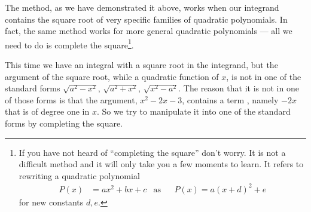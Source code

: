 The method, as we have demonstrated it above, works when our integrand contains the
square root of very specific families of quadratic polynomials. In fact, the same
method works for more general quadratic polynomials --- all we need to do is complete
the square\footnote{If you have not heard of ``completing the square'' don't worry. It
is not a difficult method and it will only take you a few moments to learn. It refers to
rewriting a quadratic polynomial
\begin{align*}
  P(x) &= ax^2 + bx + c &\text{as}&& P(x)= a(x+d)^2 +e
\end{align*}
for new constants $d,e$.
}.
\begin{eg}\label{eg:INVTRIGc}
This time we have an integral with a square root in the integrand, but
the argument of the square root, while a quadratic function of $x$, is not in
one of the standard forms $\sqrt{a^2-x^2}$, $\sqrt{a^2+x^2}$, $\sqrt{x^2-a^2}$.
The reason that it is not in one of those forms is that the argument,
$x^2-2x-3$, contains a term , namely $-2x$ that is of degree one in $x$.
So we try to manipulate it into one of the standard forms by completing
the square.


\end{eg}
